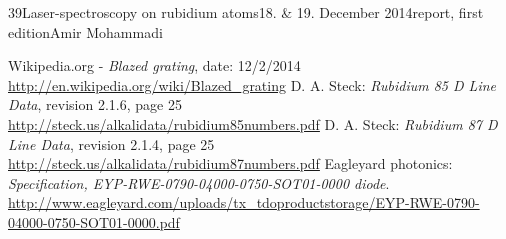 \documentclass[a4paper, parskip=half, 12pt, bibliography=totocnumbered]{scrartcl}
\begin{document}
{39}{Laser-spectroscopy on rubidium atoms}{18. \& 19. December 2014}{report, first edition}{Amir Mohammadi}{}





\begin{thebibliography}{10}
 Wikipedia.org - \emph{Blazed grating}, date: 12/2/2014\\
\url{http://en.wikipedia.org/wiki/Blazed_grating}
 D. A. Steck: \emph{Rubidium 85 D Line Data}, revision 2.1.6, page 25\\
\url{http://steck.us/alkalidata/rubidium85numbers.pdf}
 D. A. Steck: \emph{Rubidium 87 D Line Data}, revision 2.1.4, page 25\\
\url{http://steck.us/alkalidata/rubidium87numbers.pdf}
 Eagleyard photonics: \emph{Specification, EYP-RWE-0790-04000-0750-SOT01-0000 diode}.\\
\url{http://www.eagleyard.com/uploads/tx_tdoproductstorage/EYP-RWE-0790-04000-0750-SOT01-0000.pdf}
\end{thebibliography}
\end{document}
